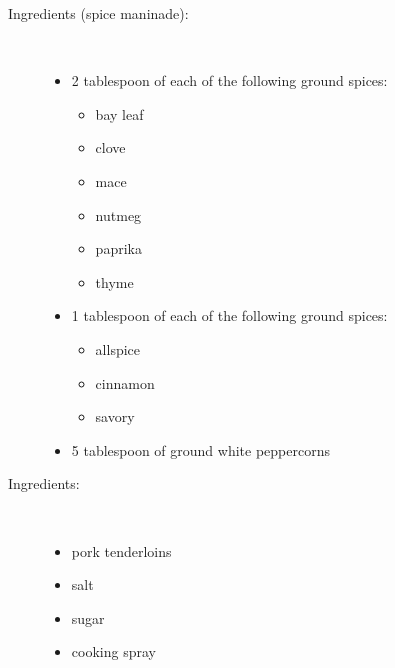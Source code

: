 \documentclass[11pt,letterpaper]{article}
\begin{document}


 
\begin{description}

\item[Ingredients (spice maninade):]\ \\
	\begin{itemize}
	\item 2 tablespoon of each of the following ground spices:
		\begin{itemize}
		\item bay leaf
		\item clove
		\item mace
		\item nutmeg
		\item paprika
		\item thyme
		\end{itemize}
	\item 1 tablespoon of each of the following ground spices:
		\begin{itemize}
		\item allspice
		\item cinnamon
		\item savory
		\end{itemize}
	\item 5 tablespoon of ground white peppercorns
	\end{itemize}

\item[Ingredients:]\ \\
	\begin{itemize}
	\item pork tenderloins
	\item salt
	\item sugar
	\item cooking spray
	\end{itemize}


\end{description}
\end{document}
